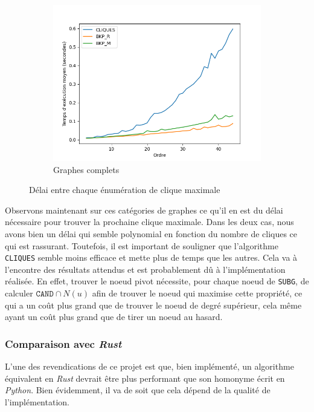 \documentclass[12pt,a4paper]{article}
\begin{document}
\begin{figure}[ht]
\begin{subfigure}[b]{0.42\textwidth}
    \includegraphics[width=\textwidth]{images/delay_pivot_complete_plot.png}
    \caption{Graphes complets}
    \label{subfig:delay_complete}
  \end{subfigure}
  \caption{Délai entre chaque énumération de clique maximale}
  \label{fig:special_delay}
\end{figure}

Observons maintenant sur ces catégories de graphes ce qu'il en est du délai nécessaire pour trouver la prochaine clique maximale. Dans les deux cas, nous avons bien un délai qui semble polynomial en fonction du nombre de cliques ce qui est rassurant. Toutefois, il est important de souligner que l'algorithme \texttt{CLIQUES} semble moins efficace et mette plus de temps que les autres. Cela va à l'encontre des résultats attendus et est probablement dû à l'implémentation réalisée. En effet, trouver le noeud pivot nécessite, pour chaque noeud de \texttt{SUBG}, de calculer \(\texttt{CAND} \cap N(u)\) afin de trouver le noeud qui maximise cette propriété, ce qui a un coût plus grand que de trouver le noeud de degré supérieur, cela même ayant un coût plus grand que de tirer un noeud au hasard.

\subsubsection*{Comparaison avec \emph{Rust}}

L'une des revendications de ce projet est que, bien implémenté, un algorithme équivalent en \emph{Rust} devrait être plus performant que son homonyme écrit en \emph{Python}. Bien évidemment, il va de soit que cela dépend de la qualité de l'implémentation.
\end{document}
